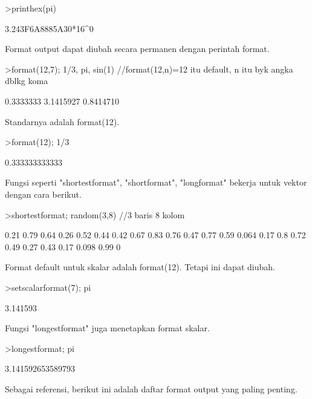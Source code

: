 \documentclass[a4paper,10pt]{article}
\begin{document}
\begin{eulernotebook}
\begin{eulerprompt}
>printhex(pi)
\end{eulerprompt}
\begin{euleroutput}
  3.243F6A8885A30*16^0
\end{euleroutput}
\begin{eulercomment}
Format output dapat diubah secara permanen dengan perintah format.
\end{eulercomment}
\begin{eulerprompt}
>format(12,7); 1/3, pi, sin(1) //format(12,n)=12 itu default, n itu byk angka dblkg koma
\end{eulerprompt}
\begin{euleroutput}
    0.3333333 
    3.1415927 
    0.8414710 
\end{euleroutput}
\begin{eulercomment}
Standarnya adalah format(12).
\end{eulercomment}
\begin{eulerprompt}
>format(12); 1/3
\end{eulerprompt}
\begin{euleroutput}
  0.333333333333
\end{euleroutput}
\begin{eulercomment}
Fungsi seperti "shortestformat", "shortformat", "longformat" bekerja
untuk vektor dengan cara berikut.
\end{eulercomment}
\begin{eulerprompt}
>shortestformat; random(3,8) //3 baris 8 kolom
\end{eulerprompt}
\begin{euleroutput}
    0.21   0.79   0.64   0.26   0.52   0.44   0.42   0.67 
    0.83   0.76   0.47   0.77   0.59  0.064   0.17    0.8 
    0.72   0.49   0.27   0.43   0.17  0.098   0.99      0 
\end{euleroutput}
\begin{eulercomment}
Format default untuk skalar adalah format(12). Tetapi ini dapat
diubah.
\end{eulercomment}
\begin{eulerprompt}
>setscalarformat(7); pi 
\end{eulerprompt}
\begin{euleroutput}
  3.141593
\end{euleroutput}
\begin{eulercomment}
Fungsi "longestformat" juga menetapkan format skalar.
\end{eulercomment}
\begin{eulerprompt}
>longestformat; pi
\end{eulerprompt}
\begin{euleroutput}
  3.141592653589793
\end{euleroutput}
\begin{eulercomment}
Sebagai referensi, berikut ini adalah daftar format output yang paling
penting.


\end{eulercomment}
\end{eulernotebook}
\end{document}
